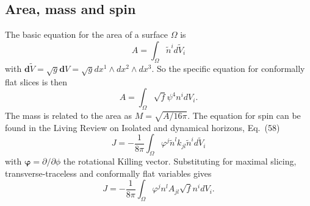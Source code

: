 \documentclass[a4paper,10pt]{article}
\begin{document}
\subsection{Area, mass and spin}
The basic equation for the area of a surface $\Omega$ is
\begin{equation}
  A = \int_\Omega{\tilde{n}^id\tilde{V}_i}
\end{equation}
with $\mathbf{d}\tilde{V} = \sqrt{g}\mathbf{d}V = \sqrt{g} dx^1\wedge dx^2\wedge dx^3$. So the specific equation for conformally flat slices is then
\begin{equation}
 A = \int_\Omega{\sqrt{f}\psi^4 n^idV_i}.
\end{equation}
The mass is related to the area as $M = \sqrt{A/16\pi}$. The equation for spin can be found in the Living Review on Isolated and dynamical horizons, Eq.~(58)
\begin{equation}
 J = -\frac{1}{8\pi}\int_\Omega{\varphi^j\tilde{n}^l k_{jl}\tilde{n}^id\tilde{V}_i}
\end{equation}
with $\mathbf{\varphi} = \partial/\partial\phi$ the rotational Killing vector. Substituting for maximal slicing, transverse-traceless and conformally flat variables gives
\begin{equation}
 J = -\frac{1}{8\pi}\int_\Omega{\varphi^j n^l A_{jl}\sqrt{f} n^idV_i}.
\end{equation}
\end{document}
